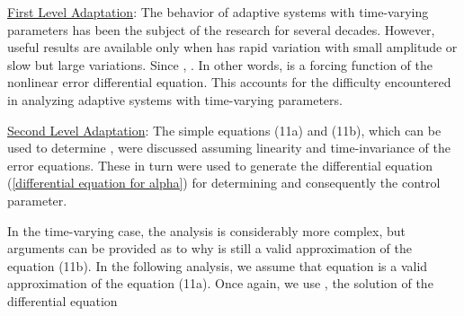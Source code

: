 \documentclass[conference]{IEEEtran}
\begin{document}
{\large \underline{First Level Adaptation}}: The behavior of adaptive systems with time-varying parameters has been the subject of the research for several decades. However, useful results are available only when  has rapid variation with small amplitude or slow but large variations. Since , . In other words,  is a forcing function of the nonlinear error differential equation. This accounts for the difficulty encountered in analyzing adaptive systems with time-varying parameters.

{\large \underline{Second Level Adaptation}}: The simple equations (11a) and (11b), which can be used to determine , were discussed assuming linearity and time-invariance of the error equations. These in turn were used to generate the differential equation (\ref{differential equation for alpha}) for determining  and consequently the control parameter.

In the time-varying case, the analysis is considerably more complex, but arguments can be provided as to why  is still a valid approximation of the equation (11b).
In the following analysis, we assume that equation  is a valid approximation of the equation (11a). Once again, we use , the solution of the differential equation
\end{document}
